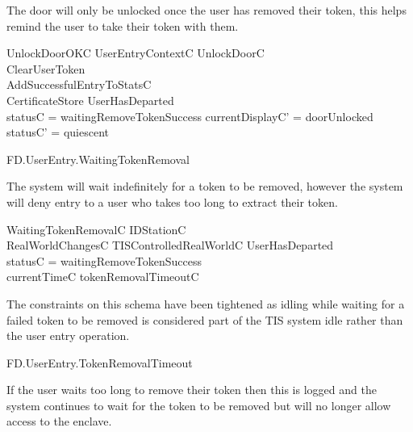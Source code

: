 The door will only be unlocked once the user has removed their token,
this helps remind the user to take their token with them.

\begin{schema}{UnlockDoorOKC}
        UserEntryContextC
\also
        UnlockDoorC
\\      ClearUserToken
\\      AddSuccessfulEntryToStatsC
\\      \Xi CertificateStore
\where
        UserHasDeparted
\\      statusC = waitingRemoveTokenSuccess
\also
        currentDisplayC' = doorUnlocked
\\      statusC' = quiescent
\end{schema}

\begin{traceunit}{FD.UserEntry.WaitingTokenRemoval}
\end{traceunit}


The system will wait indefinitely for a token to be removed, however
the system will deny entry to a user who takes too long to extract
their token.

\begin{schema}{WaitingTokenRemovalC}
        \Xi IDStationC
\\      RealWorldChangesC
\also
        \Xi TISControlledRealWorldC
\where
        \lnot UserHasDeparted
\\      statusC = waitingRemoveTokenSuccess  
\\      currentTimeC \leq tokenRemovalTimeoutC 
\end{schema}
\begin{Zcomment}
\item
The constraints on this schema have been tightened as idling while
waiting for a failed token to be removed is considered part of the TIS
system idle rather than the user entry operation.
\end{Zcomment}

\begin{traceunit}{FD.UserEntry.TokenRemovalTimeout}
\end{traceunit}

If the user waits too long to remove their token then this is logged
and the system continues to wait for the token to be removed but will
no longer allow access to the enclave.

